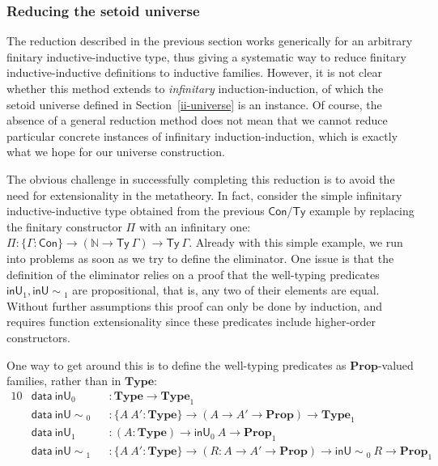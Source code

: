 \documentclass[autoref]{llncs}
\newcommand{\GG}{\Gamma}
\newcommand{\inU}{\mathsf{inU}}
\newcommand{\inUU}{\mathsf{inU{\sim}}}
\newcommand{\mType}{\mathbf{Type}}
\newcommand{\mProp}{\mathbf{Prop}}
\begin{document}
\subsubsection{Reducing the setoid universe}\label{inductive-universe}

The reduction described in the previous section works generically for an
arbitrary finitary inductive-inductive type, thus giving a systematic way to
reduce finitary inductive-inductive definitions to inductive families. However,
it is not clear whether this method extends to \emph{infinitary}
induction-induction, of which the setoid universe defined in
Section~\ref{ii-universe} is an instance.
%
Of course, the absence of a general reduction method does not mean that we cannot
reduce particular concrete instances of infinitary induction-induction, which is
exactly what we hope for our universe construction.

The obvious challenge in successfully completing this reduction is to avoid the
need for extensionality in the metatheory. In fact, consider the simple
infinitary inductive-inductive type obtained from the previous $\textsf{Con/Ty}$
example by replacing the finitary constructor $\Pi$ with an infinitary one: $\Pi
: \{\GG : \textsf{Con}\} \to (\mathds{N} \to \textsf{Ty}\ \GG) \to
\textsf{Ty}\ \GG$. Already with this simple example, we run into problems as
soon as we try to define the eliminator. One issue is that the definition of the
eliminator relies on a proof that the well-typing predicates $\inU_1,
\inUU_1$ are propositional, that is, any two of their elements are equal.
%
Without further assumptions this proof can only be done by induction, and
requires function extensionality since these predicates include higher-order
constructors.

One way to get around this is to define the well-typing predicates as
$\mProp$-valued families, rather than in $\mType$:
\vspace{-0.2em}
\begin{alignat*}{10}
  & \textsf{data}\ \inU_0 && : \mType \to \mType_1 \\
  & \textsf{data}\ \inUU_0 && : \{A\ A' : \mType\} \to (A \to A' \to \mProp) \to \mType_1 \\
  & \textsf{data}\ \inU_1 && : (A : \mType) \to \inU_0\ A \to \mProp_1 \\
  & \textsf{data}\ \inUU_1 && : \{A\ A' : \mType\} \to (R : A \to A' \to \mProp) \to \inUU_0\ R \to \mProp_1
\end{alignat*}
\end{document}
